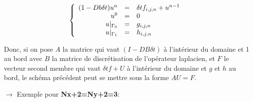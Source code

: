 \documentclass[a4paper,12pt,twoside]{report}
\begin{document}
\[
\left\{
\begin{array}{r c l}
(1-Db\delta t)u^{n}&=&\delta t f_{i,j,n} + u^{n-1}
   \\
 u^{0}&=&0\\
 u|_{\Gamma_{0}}&=&g_{i,j,n}  \\
 u|_{\Gamma_{1}}&=&h_{i,j,n} \\
\end{array}
\right.
\]

Donc, si on pose $ A$ la matrice qui vaut 
$(I-DB\delta t)$ à l'intérieur du domaine et 1 au bord avec $B$ la matrice de discrétisation de l'opérateur laplacien, et $F$ le vecteur second membre qui vaut $\delta tf + U $ à l'intérieur du domaine et $g$ et $h$ au bord, le schéma précédent peut se mettre sous la forme $AU=F$.

\clearpage
$\rightarrow$ Exemple pour {\color{teal}\textbf{Nx+2=Ny+2=3}}: 
\end{document}
